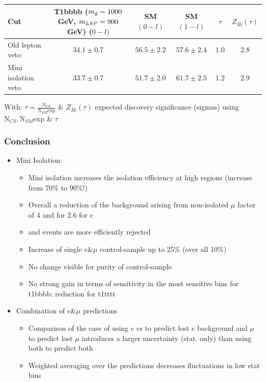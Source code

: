 \documentclass{beamer}
\begin{document}
\begin{frame}
\begin{center}
   \begin{tabular}{lc|cc|cc}
    \hline
    \hline
    Cut & T1bbbb ($m_{\tilde{g}}=1000$ GeV, $m_{LSP}=900$ GeV) ($0-l)$ & SM $(0-l)$ & SM $(1-l)$ & $\tau$ & $Z_{Bi}(\tau)$ \\ \hline
Old lepton veto & $34.1 \pm 0.7$ & $56.5 \pm 2.2$ & $57.6 \pm 2.4$ &  $1.0$ & $2.8$  \\
Mini isolation veto & $33.7 \pm 0.7$ & $51.7 \pm 2.0$ & $61.7 \pm 2.5$ &  $1.2$ & $2.9$  \\
    \hline
    \hline
  \end{tabular}
  \end{center}
  With: $\tau=\frac{\text{N}_{CS}}{\text{N}_{SM}\text{exp}}$ \& $Z_{Bi}(\tau)$ expected discovery significance (sigmas) using $\text{N}_{CS}, \text{N}_{SM}\text{exp}$ \& $\tau$
\end{frame}

\begin{frame}
 \frametitle{Conclusion}
 \begin{itemize}
  \item Mini Isolation:
 \begin{itemize}
  \item Mini isolation increases the isolation efficiency at high \HT regions (increase from 70\% to 90\%!)
  \item Overall a reduction of the background arising from non-isolated $\mu$ factor of 4 and for 2.6  for $e$
  \item \wpj and \ttbar events are more efficiently rejected
  \item Increase of single $e \& \mu$ control-sample up to 25\% (over all 10\%) 
  \item No change visible for purity of control-sample
  \item No strong gain in terms of sensitivity in the most sensitive bins for t1bbbb: reduction for t1tttt
  \end{itemize}
  \item Combination of $e \& \mu$ predictions
  \begin{itemize}
   \item Comparison of the case of using $e$ cs to predict lost $e$ background and $\mu$ to predict lost $\mu$ introduces a larger uncertainty (stat. only) than using both to predict both
   \item Weighted averaging over the predictions decreases fluctuations in low stat bins
  \end{itemize}

 \end{itemize}

\end{frame}
\end{document}
